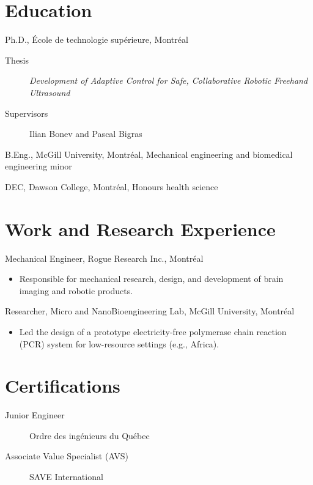 \documentclass{article}
\begin{document}
\section{Education}
\begin{description}[align=right]
  \item [2014--] Ph.D., École de technologie supérieure, Montréal
  \begin{description}
    \item [Thesis] \emph{Development of Adaptive Control for Safe, Collaborative Robotic Freehand Ultrasound}
    \item [Supervisors] Ilian Bonev and Pascal Bigras
  \end{description}
  \item [2010--2014] B.Eng., McGill University, Montréal, Mechanical engineering and biomedical engineering minor
  \item [2008--2010] DEC, Dawson College, Montréal, Honours health science
\end{description}

\section{Work and Research Experience}
\begin{description}[align=right]
  \item [2011--] Mechanical Engineer, Rogue Research Inc., Montréal
  \begin{itemize}
    \item Responsible for mechanical research, design, and development of brain imaging and robotic products.
  \end{itemize}
  \item [2013--2014] Researcher, Micro and NanoBioengineering Lab, McGill University, Montréal
  \begin{itemize}
    \item Led the design of a prototype electricity-free polymerase chain reaction (PCR) system for low-resource settings (e.g., Africa).
  \end{itemize}
\end{description}

\section{Certifications}
\begin{description}
  \item[Junior Engineer] Ordre des ingénieurs du Québec
  \item[Associate Value Specialist (AVS)] SAVE International
\end{description}
\end{document}
